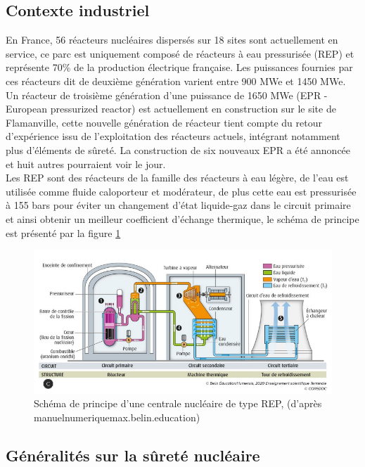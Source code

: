 \subsection{Contexte industriel}
En France, 56 réacteurs nucléaires dispersés sur 18 sites sont actuellement en service, ce parc est uniquement composé de réacteurs à eau pressurisée (REP) et représente 70\% de la production électrique française. Les puissances fournies par ces réacteurs dit de deuxième génération varient entre 900 MWe et 1450 MWe. Un réacteur de troisième génération d'une puissance de 1650 MWe (EPR - European pressurized reactor) est actuellement en construction sur le site de Flamanville, cette nouvelle génération de réacteur tient compte du retour d'expérience issu de l'exploitation des réacteurs actuels, intégrant notamment plus d'éléments de sûreté. La construction de six nouveaux EPR a été annoncée et huit autres pourraient voir le jour. \\
Les REP sont des réacteurs de la famille des réacteurs à eau légère, de l'eau est utilisée comme fluide caloporteur et modérateur, de plus cette eau est pressurisée à 155 bars pour éviter un changement d'état liquide-gaz dans le circuit primaire et ainsi obtenir un meilleur coefficient d'échange thermique, le schéma de principe est présenté par la figure \ref{fig:schcentrale1} %
\begin{figure}[H]
	\centering
	\includegraphics[width=0.8\linewidth]{figure/sch_centrale1}
	\caption[Schéma de principe d'une centrale nucléaire de type REP]{Schéma de principe d'une centrale nucléaire de type REP, (d'après manuelnumeriquemax.belin.education)}
	\label{fig:schcentrale1}
\end{figure} 
\subsection{Généralités sur la sûreté nucléaire}

